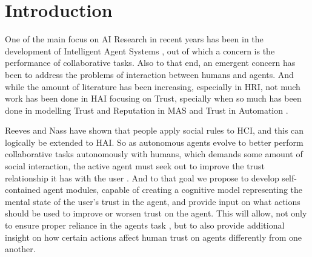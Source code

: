 \section{Introduction}
\label{sec:Introduction}

One of the main focus on \ac{AI} Research in recent years has been in the development of Intelligent Agent Systems \cite{Russell2009a}, out of which a concern is the performance of collaborative tasks\cite{Grosz1996, Allen2002, Allen2007}. Also to that end, an emergent concern has been to address the problems of interaction between humans and agents\cite{Bradshaw2011}. And while the amount of literature has been increasing, especially in \ac{HRI}\cite{Goodrich2007}, not much work has been done in \ac{HAI} focusing on Trust, specially when so much has been done in modelling Trust and Reputation in \ac{MAS}\cite{Granatyr2015} and Trust in Automation \cite{Lee1992, Jones1997, Lee2004}.

Reeves and Nass have shown that people apply social rules to \ac{HCI}, and this can logically be extended to \ac{HAI}\cite{Reeves1998a}. So as autonomous agents evolve to better perform collaborative tasks autonomously with humans, which demands some amount of social interaction, the active agent must seek out to improve the trust relationship it has with the user \cite{Lashkari1994}. And to that goal we propose to develop self-contained agent modules, capable of creating a cognitive model representing the mental state of the user's trust in the agent, and provide input on what actions should be used to improve or worsen trust on the agent. This will allow, not only to ensure proper reliance in the agents task \cite{Lee2004}, but to also provide additional insight on how certain actions affect human trust on agents differently from one another.


